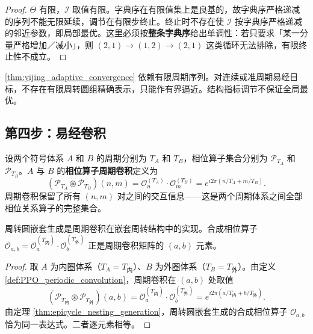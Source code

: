 \begin{proof}
$\Theta$ 有限，$\mathcal I$ 取值有限。字典序在有限值集上是良基的，故字典序严格递减的序列不能无限延续，调节在有限步终止。终止时不存在使 $\mathcal I$ 按字典序严格递减的邻近参数，即局部最优。这里必须按\textbf{整条字典序}给出单调性：若只要求「某一分量严格增加／减小」，则 $(2,1)\to(1,2)\to(2,1)$ 这类循环无法排除，有限终止性不成立。
\end{proof}

\begin{remark}[动态调节的边界]\label{rem:yijing_adaptive_boundary}
\cref{thm:yijing_adaptive_convergence} 依赖有限周期序列。对连续或准周期易经目标，不存在有限周转圆组精确表示，只能作有界逼近。结构指标调节不保证全局最优。
\end{remark}

\subsection{第四步：易经卷积}

\begin{definition}[相位算子周期卷积]\label{def:PPO_periodic_convolution}
设两个符号体系 $A$ 和 $B$ 的周期分别为 $T_A$ 和 $T_B$，相位算子集合分别为 $\mathcal{P}_{T_A}$ 和 $\mathcal{P}_{T_B}$。$A$ 与 $B$ 的\textbf{相位算子周期卷积}定义为
\[
(\mathcal{P}_{T_A} \circledast \mathcal{P}_{T_B})(n, m) = \mathcal{O}_n^{(T_A)} \cdot \mathcal{O}_m^{(T_B)} = e^{i2\pi(n/T_A + m/T_B)}.
\]
周期卷积保留了所有 $(n,m)$ 对之间的交互信息——这是两个周期体系之间全部相位关系算子的完整集合。
\end{definition}

\begin{proposition}[周期卷积与周转圆嵌套生成的一致性]\label{prop:periodic_conv_epicycle_consistency}
周转圆嵌套生成是周期卷积在嵌套周转结构中的实现。合成相位算子 $\mathcal{O}_{a,b} = \mathcal{O}_a^{(T_{\text{内}})} \cdot \mathcal{O}_b^{(T_{\text{外}})}$ 正是周期卷积矩阵的 $(a,b)$ 元素。
\end{proposition}

\begin{proof}
取 $A$ 为内圈体系（$T_A = T_{\text{内}}$）、$B$ 为外圈体系（$T_B = T_{\text{外}}$）。由定义 \ref{def:PPO_periodic_convolution}，周期卷积在 $(a,b)$ 处取值
\[
(\mathcal{P}_{T_{\text{内}}} \circledast \mathcal{P}_{T_{\text{外}}})(a,b) = \mathcal{O}_a^{(T_{\text{内}})} \cdot \mathcal{O}_b^{(T_{\text{外}})} = e^{i2\pi(a/T_{\text{内}} + b/T_{\text{外}})}.
\]
由定理 \ref{thm:epicycle_nesting_generation}，周转圆嵌套生成的合成相位算子 $\mathcal{O}_{a,b}$ 恰为同一表达式。二者逐元素相等。
\end{proof}

